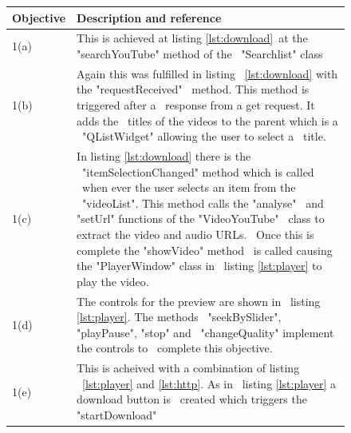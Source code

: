\documentclass{article}
\begin{document}
\begin{figure}[H]
    \begin{tabular} {| p{2cm} | p{10cm} |}
        \hline
        \textbf{Objective}   &         \textbf{Description and reference}   \\ \hline
        1(a)                 &This is achieved at listing \ref{lst:download}\
                              at the "searchYouTube" method of the          \
                              "Searchlist" class                            \\ \hline
        1(b)                 &Again this was fulfilled in listing          \
                              \ref{lst:download} with the "requestReceived" \
                              method. This method is triggered after a      \
                              response from a get request. It adds the      \
                              titles of the videos to the parent which is a \
                              "QListWidget" allowing the user to select a   \
                              title.                                        \\ \hline
        1(c)                 & In listing \ref{lst:download} there is the   \
                              "itemSelectionChanged" method which is called \
                              when ever the user selects an item from the   \
                              "videoList". This method calls  the "analyse" \
                              and "setUrl" functions of the "VideoYouTube"  \
                              class to extract the video and audio URLs.    \
                              Once this is complete the "showVideo" method  \
                              is called causing the "PlayerWindow" class in \
                              listing \ref{lst:player} to play the video.   \\ \hline
        1(d)                &The controls for the preview are shown in      \
                             listing \ref{lst:player}. The methods          \
                             "seekBySlider", "playPause", "stop" and        \
                             "changeQuality" implement the controls to      \
                             complete this objective.                       \\ \hline
        1(e)                &This is acheived with a combination of listing \
                             \ref{lst:player} and \ref{lst:http}. As in     \
                             listing \ref{lst:player} a download button is  \
                             created which triggers the "startDownload"     \

\end{tabular}
\end{figure}
\end{document}
